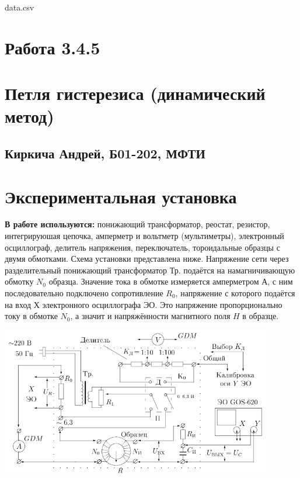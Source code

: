 

\begin{filecontents*}{data.csv}
\end{filecontents*}



\section*{Работа 3.4.5}	
\section*{Петля гистерезиса (динамический метод)}
\subsection*{Киркича Андрей, Б01-202, МФТИ}

\section*{Экспериментальная установка}

\textbf{В работе используются:} понижающий трансформатор, реостат, резистор, интегрируюшая цепочка, амперметр и вольтметр (мультиметры), электронный осциллограф, делитель напряжения, переключатель, тороидальные образцы с двумя обмотками.
\n\n
Схема установки представлена ниже. Напряжение сети через разделительный понижающий трансформатор Тр. подаётся на намагничивающую обмотку $N_0$ образца. Значение тока в обмотке измеряется амперметром А, с ним последовательно подключено сопротивление $R_0$, напряжение с которого подаётся на вход Х электронного осциллографа ЭО. Это напряжение пропорционально току в обмотке $N_0$, а значит и напряжённости магнитного поля $H$ в образце.\n

\begin{center}
    \includegraphics[width=0.9\textwidth]{1.png}
    \label{pic1}
\end{center}

